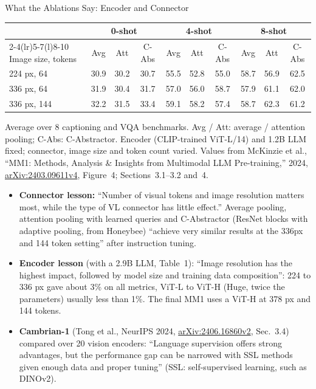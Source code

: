 \begin{frame}{What the Ablations Say: Encoder and Connector}
  \begingroup\centering
  {\scriptsize\setlength{\tabcolsep}{4pt}
  \begin{tabular}{@{}l ccc ccc ccc@{}}
    \toprule
     & \multicolumn{3}{c}{0-shot} & \multicolumn{3}{c}{4-shot} & \multicolumn{3}{c}{8-shot} \\
    \cmidrule(lr){2-4}\cmidrule(lr){5-7}\cmidrule(l){8-10}
    Image size, tokens & Avg & Att & C-Abs & Avg & Att & C-Abs & Avg & Att & C-Abs \\
    \midrule
    224 px, 64 & 30.9 & 30.2 & 30.7 & 55.5 & 52.8 & 55.0 & 58.7 & 56.9 & 62.5 \\
    336 px, 64 & 31.9 & 30.4 & 31.7 & 57.0 & 56.0 & 58.7 & 57.9 & 61.1 & 62.0 \\
    336 px, 144 & 32.2 & 31.5 & 33.4 & 59.1 & 58.2 & 57.4 & 58.7 & 62.3 & 61.2 \\
    \bottomrule
  \end{tabular}\par}
  \vspace{0.2em}
  {\scriptsize Average over 8 captioning and VQA benchmarks. Avg / Att: average / attention pooling; C-Abs: C-Abstractor. Encoder (CLIP-trained ViT-L/14) and 1.2B LLM fixed; connector, image size and token count varied. Values from McKinzie et al., ``MM1: Methods, Analysis \& Insights from Multimodal LLM Pre-training,'' 2024, \href{https://arxiv.org/abs/2403.09611v4}{arXiv:2403.09611v4}, Figure~4; Sections~3.1--3.2 and~4.\par}
  \endgroup
  \vspace{0.2em}
  \begin{itemize}\scriptsize\itemsep0.25em
    \item \textbf{Connector lesson:} ``Number of visual tokens and image resolution matters most, while the type of VL connector has little effect.'' Average pooling, attention pooling with learned queries and C-Abstractor (ResNet blocks with adaptive pooling, from Honeybee) ``achieve very similar results at the 336px and 144 token setting'' after instruction tuning.
    \item \textbf{Encoder lesson} (with a 2.9B LLM, Table~1): ``Image resolution has the highest impact, followed by model size and training data composition'': 224 to 336 px gave about 3\% on all metrics, ViT-L to ViT-H (Huge, twice the parameters) usually less than 1\%. The final MM1 uses a ViT-H at 378 px and 144 tokens.
    \item \textbf{Cambrian-1} (Tong et al., NeurIPS 2024, \href{https://arxiv.org/abs/2406.16860v2}{arXiv:2406.16860v2}, Sec.~3.4) compared over 20 vision encoders: ``Language supervision offers strong advantages, but the performance gap can be narrowed with SSL methods given enough data and proper tuning'' (SSL: self-supervised learning, such as DINOv2).
  \end{itemize}
\end{frame}

